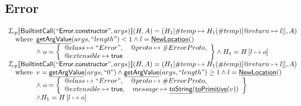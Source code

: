 \documentclass{article}
\makeatletter
\newcommand{\SF}[1]{\mbox{\textsf{#1}}}
\newcommand{\wherec}[1]{{\rm where}\begin{array}[t]{l}#1\end{array}}
\newcommand{\I}{\mathcal{I}}
\newcommand{\set}[1]{\left\{\begin{array}{l}#1\end{array}\right\}}
\newcommand{\lbr}{\llbracket}
\newcommand{\rbr}{\rrbracket}
\newcommand{\hf}[1]{\underline{\sf #1}}
\newcommand{\varprop}[1]{@#1}
\newcommand{\vtrue}{\SF{true}}
\makeatother
\begin{document}
\subsection{Error}
\[
\begin{array}{l}
\I _{cp}\lbr \SF{BuiltintCall}(``\SF{Error.constructor}",args)\rbr(H,A)
  = (H_1[\#temp \mapsto H_1(\#temp)[@return \mapsto l]], A)\\
\quad\wherec{
  \hf{getArgValue}(args, ``length") < 1 
  \land l=\hf{NewLocation}()\\
  \land\ o = \set{
    \varprop{class}\mapsto ``Error", \quad
    \varprop{proto}\mapsto \#ErrorProto,\\
    \varprop{extensible}\mapsto \vtrue
    }
  \land H_1=H\left[l\mapsto o\right]\\
  }\\
  
\I _{cp}\lbr \SF{BuiltintCall}(``\SF{Error.constructor}",args)\rbr(H,A)
  = (H_1[\#temp \mapsto H_1(\#temp)[@return \mapsto l]], A)\\
\quad\wherec{
  v = \hf{getArgValue}(args, ``0") \land \hf{getArgValue}(args, ``length") \geq 1
  \land l=\hf{NewLocation}()\\
  \land\ o = \set{
    \varprop{class}\mapsto ``Error", \quad
    \varprop{proto}\mapsto \#ErrorProto,\\
    \varprop{extensible}\mapsto \vtrue,  \quad
    message \mapsto \hf{toString}(\hf{toPrimitive}(v)) 
    }\\
  \land H_1=H\left[l\mapsto o\right]
  }\\

\end{array}
\]
\end{document}
